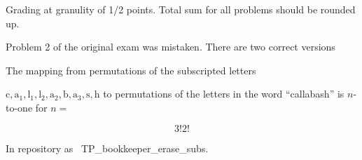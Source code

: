 \documentclass[quiz]{mcs}
\begin{document}
\renewcommand{\exampreamble}{   %
  \begin{tabular}{l}
    \textbf{Circle your}\quad   \teaminfo
  \end{tabular}

  \begin{itemize}

  \item
   This exam is \textbf{closed book} except for a 1-sided cribsheet.
   Total time is 20 minutes. 

  \item
   Write your solutions in the space provided.  If you need more
   space, write on the back of the sheet containing the problem.

\iffalse
  \item
   GOOD LUCK!
\fi

  \end{itemize}}




\begin{staffnotes}
Grading at granulity of 1/2 points.  Total sum for all problems
should be rounded up.
\end{staffnotes}


Problem 2 of the original exam was mistaken.  There are two correct versions

\begin{problem}

\bparts

\ppart 
The mapping from permutations of the subscripted letters
\iffalse
$\text{c}\,\text{a}_1\,\text{l}_1\,\text{l}_2\,\text{a}_2\,\text{b}\,\text{a}_3\,\text{s}\,\text{h}$
\fi
$\text{c},\text{a}_1,\text{l}_1,\text{l}_2,\text{a}_2,\text{b},\text{a}_3,\text{s},\text{h}$
  to permutations of the letters in the word ``callabash'' is
  $n$-to-one for $n=$\hfill \examrule[0.7in]

\begin{solution}
\[
3! 2!
\]
\end{solution}
\begin{staffnotes}
In repository as~ TP\_bookkeeper\_erase\_subs.
\end{staffnotes}

\ppart 

\eparts
\end{problem}
\end{document}
